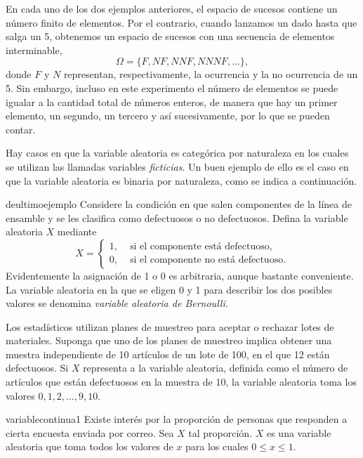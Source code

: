 En cada uno de los dos ejemplos anteriores, el espacio de sucesos contiene un número finito de elementos. Por el contrario, cuando lanzamos un dado hasta que salga un 5, obtenemos un espacio de sucesos con una secuencia de elementos interminable,
$$\Omega = \{ F, NF, NNF, NNNF, \dots \},$$
donde $F$ y $N$ representan, respectivamente, la ocurrencia y la no ocurrencia de un 5. Sin embargo, incluso en este experimento el número de elementos se puede igualar a la cantidad total de números enteros, de manera que hay un primer elemento, un segundo, un tercero y así sucesivamente, por lo que se pueden contar.

Hay casos en que la variable aleatoria es categórica por naturaleza en los cuales se utilizan las llamadas variables \emph{ficticias}. Un buen ejemplo de ello es el caso en que la variable aleatoria es binaria por naturaleza, como se indica a continuación.

\newpage

\begin{examplebox}{}{deultimoejemplo}
    Considere la condición en que salen componentes de la línea de ensamble y se les clasifica como defectuosos o no defectuosos. Defina la variable aleatoria $X$ mediante
    $$X = \begin{cases}
        1, & \text{ si el componente está defectuoso}, \\
        0, & \text{ si el componente no está defectuoso}.
    \end{cases}$$
    Evidentemente la asignación de 1 o 0 es arbitraria, aunque bastante conveniente. La variable aleatoria en la que se eligen 0 y 1 para describir los dos posibles valores se denomina \emph{variable aleatoria de Bernoulli}.
\end{examplebox}

\begin{examplebox}{}{}
    Los estadísticos utilizan planes de muestreo para aceptar o rechazar lotes de materiales. Suponga que uno de los planes de muestreo implica obtener una muestra independiente de 10 artículos de un lote de 100, en el que 12 están defectuosos. Si $X$ representa a la variable aleatoria, definida como el número de artículos que están defectuosos en la muestra de 10, la variable aleatoria toma los valores $0, 1, 2, \dots, 9, 10$.
\end{examplebox}

\begin{examplebox}{}{variablecontinua1}
    Existe interés por la proporción de personas que responden a cierta encuesta enviada por correo. Sea $X$ tal proporción. $X$ es una variable aleatoria que toma todos los valores de $x$ para los cuales $0 \leq x \leq 1$.
\end{examplebox}

